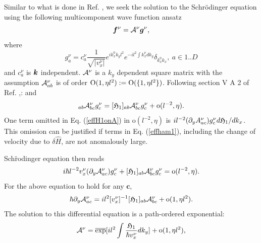 \documentclass[aps, showpacs, twocolumn, notitlepage, superscriptaddress]{revtex4-1}
\begin{document}

Similar to what is done in Ref. , we seek the solution to the Schr\"odinger equation using the following multicomponent wave function ansatz
\begin{equation}
\boldsymbol{f}^\nu={\cal A}^\nu\boldsymbol{g}^\nu,\label{wkb-wf}
\end{equation}
where 
\begin{equation}
g_a^\nu=c_{a}^\nu\frac{1}{\sqrt{|v_x^\nu|}}e^{ik^{0}_{x}k_{y}l^{2}}e^{-il^{2}\int k_{x}^\nu dk_{y}}\delta_{k^{0}_{x}k_{x}},~a\in{1..D}
\end{equation}
and $c_a^\nu$ is $\boldsymbol{k}$ independent. ${\cal A}^\nu$ is a $k_y$ dependent square matrix with the assumption ${\cal A}_{ab}^\nu$ is of order $\text{O}(1, \eta l^2):=\text{O}(\{1,\eta l^2\})$. Following section V A 2 of Ref. ,:
and
\begin{equation}
[\effH_{1}(\bK)]_{ab}\A_{bc}^\nu g_{c}^\nu=[\effH_{1}]_{ab}\A_{bc}^\nu g_{c}^\nu+\text{o}(l^{-2}, \eta).\label{effH1onA}
\end{equation}
One term omitted in Eq. (\ref{effH1onA}) in $\text{o}(l^{-2},\eta)$ is $i l^{-2}(\partial_{y}A_{ac}^\nu)g_{c}^\nu d\mathfrak{H}_1/dk_x$. This omission can be justified if terms in Eq. ({\ref{effham1}}), including the change of velocity due to $\delta\hat{H}$, are not anomalously large.

Sch\"rodinger equation then reads 
\begin{equation}
i\hbar l^{-2} v_{x}^\nu (\partial_{y}{\cal A}_{ac}^\nu)  g_{c}^\nu+[\mathfrak{H}_{1}]_{ab}{\cal A}_{bc}^\nu g_{c}^\nu=\text{o}(l^{-2}, \eta).
\end{equation}
For the above equation to hold for any $\mathbf{c}$,
\begin{equation}
\hbar\partial_{y}{\cal A}_{ac}^\nu=il^{2}[v_{x}^\nu]^{-1}[\mathfrak{H}_{1}]_{ab}{\cal A}_{bc}^\nu+{\text{o}(1, \eta l^2)}.
\end{equation}
The solution to this differential equation is a path-ordered exponential:
\begin{equation}
{\cal A}^\nu=\overline{\exp}[il^{2}\int\frac{\mathfrak{H}_{1}}{\hbar v_{x}^\nu}dk_{y}]+{\text{o}(1, \eta l^2)},
\end{equation}
\end{document}
